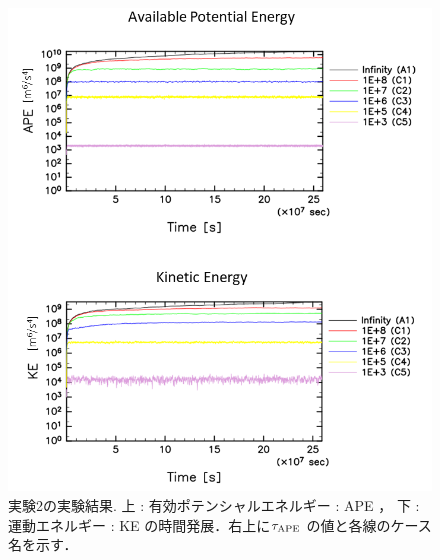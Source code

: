 \documentclass[a4j,12pt,openbib,oneside]{jreport}
\begin{document}
\begin{figure}[ht]
  \begin{center}
    \includegraphics[clip,width=12cm]{./fig/result/case2/case2_apeke.png}
    \caption{
      \footnotesize{実験2の実験結果. 上 : 有効ポテンシャルエネルギー : APE ，
下 : 運動エネルギー : KE の時間発展．右上に$\tau_{\rm{APE}}$ の値と各線のケース名を示す．
      }
    }
    \label{fig:case2_apeke}
  \end{center}
\end{figure}

\clearpage
\newpage
\end{document}
